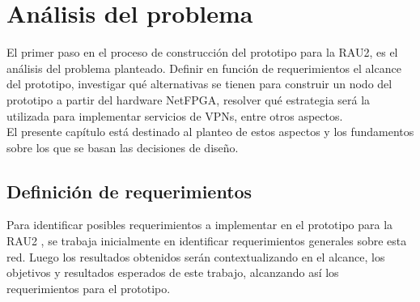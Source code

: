 \chapter{An\'alisis del problema}

\ifpdf
    \graphicspath{{Chapter3/Figs/Raster/}{Chapter3/Figs/PDF/}{Chapter3/Figs/}}
\else
    \graphicspath{{Chapter3/Figs/Vector/}{Chapter3/Figs/}}
\fi

El primer paso en el proceso de construcción del prototipo para la RAU2, es el análisis del problema planteado. Definir en función de requerimientos el alcance del prototipo, investigar qu\'e alternativas se tienen para construir un nodo del prototipo a partir del hardware NetFPGA, resolver qu\'e estrategia ser\'a la utilizada para implementar servicios de VPNs, entre otros aspectos.\\

El presente cap\'itulo est\'a destinado al planteo de estos aspectos y los fundamentos sobre los que se basan las decisiones de diseño. 




\section[Definición de requerimientos]{Definición de requerimientos}
\label{3.1}

Para identificar posibles requerimientos a implementar en el prototipo para la RAU2 , se trabaja inicialmente en identificar requerimientos generales sobre esta red. Luego los resultados obtenidos ser\'an contextualizando en el alcance, los objetivos y resultados esperados de este trabajo, alcanzando as\'i los requerimientos para el prototipo.\\

